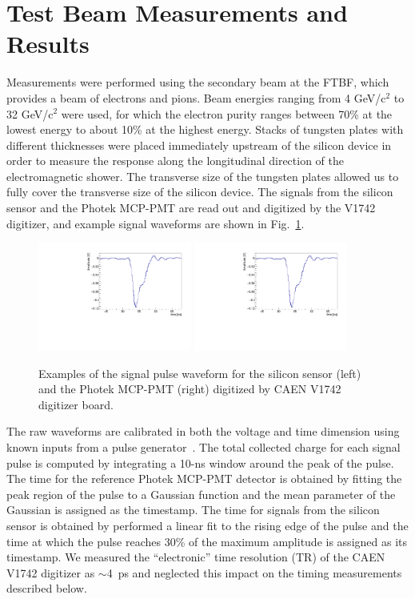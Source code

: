 \documentclass[12pt]{article}
\begin{document}
\section{Test Beam Measurements and Results} 
\label{sec:results} 

Measurements were performed using the secondary beam at the FTBF, which provides
a beam of electrons and pions. Beam energies ranging from 4 GeV/c$^2$ to 32 GeV/c$^2$
were used, for which the electron purity ranges between 70\% at the lowest
energy to about 10\% at the highest energy. Stacks of tungsten plates with
different thicknesses were placed immediately upstream of the silicon device in
order to measure the response along the longitudinal direction of the
electromagnetic shower. The transverse size of the tungsten plates allowed us to
fully cover the transverse size of the silicon device. The signals from the
silicon sensor and the Photek MCP-PMT are read out and digitized by the V1742
digitizer, and example signal waveforms are shown in Fig.~\ref{fig:pulses}.

\begin{figure}[htbp] 
\centering
\includegraphics[width=0.45\textwidth]{plots/ExampleSiliconPadPulse_6X0_16GeV.pdf} 
\includegraphics[width=0.45\textwidth]{plots/ExampleSiliconPadPulse_6X0_16GeV.pdf} 
\caption{Examples of the signal pulse waveform for the silicon sensor (left) and the Photek MCP-PMT (right) digitized by CAEN V1742 digitizer board.} 
\label{fig:pulses} 
\end{figure} 

The raw waveforms are calibrated in both the voltage and time dimension using
known inputs from a pulse generator~\cite{Kim201467}. The total collected charge for each
signal pulse is computed by integrating a 10-ns window around the peak of the
pulse. The time for the reference Photek MCP-PMT detector is obtained by fitting
the peak region of the pulse to a Gaussian function and the mean parameter of
the Gaussian is assigned as the timestamp. The time for signals from the silicon
sensor is obtained by performed a linear fit to the rising edge of the pulse and
the time at which the pulse reaches 30\% of the maximum amplitude is assigned as
its timestamp. We measured the “electronic” time resolution (TR) of the CAEN
V1742 digitizer as $\sim$4~ps and neglected this impact on the timing measurements
described below.
\end{document}
